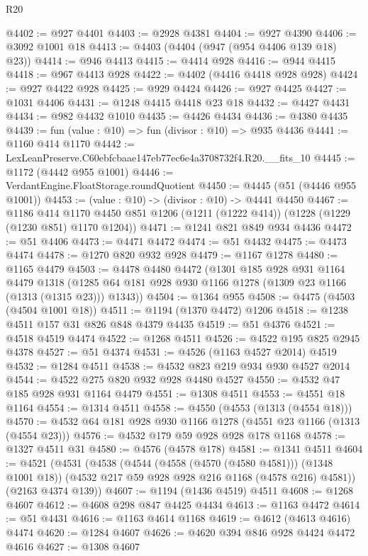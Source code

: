 \begin{lexlean}{R20}
\begin{coremodule}
@4402 := @927 @4401
@4403 := @2928 @4381
@4404 := @927 @4390
@4406 := @3092 @1001 @18
@4413 := @4403 (@4404 (@947 (@954 @4406 @139 @18) @23))
@4414 := @946 @4413
@4415 := @4414 @928
@4416 := @944 @4415
@4418 := @967 @4413 @928
@4422 := @4402 (@4416 @4418 @928 @928)
@4424 := @927 @4422 @928
@4425 := @929 @4424
@4426 := @927 @4425
@4427 := @1031 @4406
@4431 := @1248 @4415 @4418 @23 @18
@4432 := @4427 @4431
@4434 := @982 @4432 @1010
@4435 := @4426 @4434
@4436 := @4380 @4435
@4439 := fun (value : @10) => fun (divisor : @10) => @935 @4436
@4441 := @1160 @414 @1170
@4442 := LexLeanPreserve.C60ebfcbaae147eb77ec6e4a3708732f4.R20.__fits_10
@4445 := @1172 (@4442 @955 @1001)
@4446 := VerdantEngine.FloatStorage.roundQuotient
@4450 := @4445 (@51 (@4446 @955 @1001))
@4453 := (value : @10) -> (divisor : @10) -> @4441 @4450
@4467 := @1186
    @414
    @1170
    @4450
    @851
    @1206
    (@1211 (@1222 @414))
    (@1228 (@1229 (@1230 @851) @1170 @1204))
@4471 := @1241 @821 @849 @934 @4436
@4472 := @51 @4406
@4473 := @4471 @4472
@4474 := @51 @4432
@4475 := @4473 @4474
@4478 := @1270 @820 @932 @928
@4479 := @1167 @1278
@4480 := @1165 @4479
@4503 := @4478
    @4480
    @4472
    (@1301
      @185
      @928
      @931
      @1164
      @4479
      @1318
      (@1285 @64 @181 @928 @930 @1166 @1278 (@1309 @23 @1166 (@1313 (@1315 @23))) @1343))
@4504 := @1364 @955
@4508 := @4475 (@4503 (@4504 @1001 @18))
@4511 := @1194 (@1370 @4472) @1206
@4518 := @1238 @4511 @157 @31 @826 @848 @4379 @4435
@4519 := @51 @4376
@4521 := @4518 @4519 @4474
@4522 := @1268 @4511
@4526 := @4522 @195 @825 @2945 @4378
@4527 := @51 @4374
@4531 := @4526 (@1163 @4527 @2014) @4519
@4532 := @1284 @4511
@4538 := @4532 @823 @219 @934 @930 @4527 @2014
@4544 := @4522 @275 @820 @932 @928 @4480 @4527
@4550 := @4532 @47 @185 @928 @931 @1164 @4479
@4551 := @1308 @4511
@4553 := @4551 @18 @1164
@4554 := @1314 @4511
@4558 := @4550 (@4553 (@1313 (@4554 @18)))
@4570 := @4532 @64 @181 @928 @930 @1166 @1278 (@4551 @23 @1166 (@1313 (@4554 @23)))
@4576 := @4532 @179 @59 @928 @928 @178 @1168
@4578 := @1327 @4511 @31
@4580 := @4576 (@4578 @178)
@4581 := @1341 @4511
@4604 := @4521
    (@4531
      (@4538
        (@4544 (@4558 (@4570 (@4580 @4581))) (@1348 @1001 @18))
        (@4532 @217 @59 @928 @928 @216 @1168 (@4578 @216) @4581))
      (@2163 @4374 @139))
@4607 := @1194 (@1436 @4519) @4511
@4608 := @1268 @4607
@4612 := @4608 @298 @847 @4425 @4434
@4613 := @1163 @4472
@4614 := @51 @4431
@4616 := @1163 @4614 @1168
@4619 := @4612 (@4613 @4616) @4474
@4620 := @1284 @4607
@4626 := @4620 @394 @846 @928 @4424 @4472 @4616
@4627 := @1308 @4607

\end{coremodule}
\end{lexlean}
